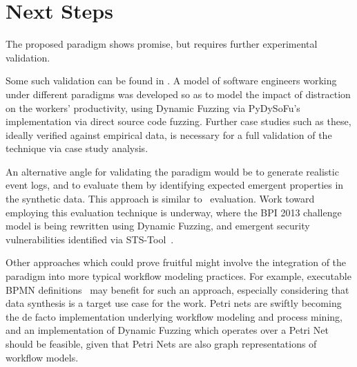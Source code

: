 \documentclass[draft,12pt]{llncs}  %
\begin{document}

\section{Next Steps}
\label{sec:future_work}
\label{sec:conclusion}
The proposed paradigm shows promise, but requires further experimental
validation.
\par

Some such validation can be found in \cite{wallis2018modelling}. A model
of software engineers working under different paradigms was developed so as to
model the impact of distraction on the workers' productivity, using Dynamic
Fuzzing via PyDySoFu's implementation via direct source code fuzzing. Further
case studies such as these, ideally verified against empirical data, is
necessary for a full validation of the technique via case study analysis.
\par

An alternative angle for validating the paradigm would be to generate realistic
event logs, and to evaluate them by identifying expected emergent properties in
the synthetic data. This approach is similar to~\cite{accorsi2013secsy}
evaluation. Work toward employing this evaluation technique is underway, where
the BPI 2013 challenge model is being rewritten using Dynamic
Fuzzing, and emergent security vulnerabilities identified via
STS-Tool~\citep{salnitri2015sts}.
\par

Other approaches which could prove fruitful might involve the integration of the
paradigm into more typical workflow modeling practices. For example, executable
BPMN definitions~\citep{mitsyuk2017generating} may benefit for such an approach,
especially considering that data synthesis is a target use case for the work.
Petri nets are swiftly becoming the de facto implementation underlying workflow
modeling and process mining, and an
implementation of Dynamic Fuzzing which operates over a Petri Net should be
feasible, given that Petri Nets are also graph representations of workflow
models. 
\par
\end{document}
